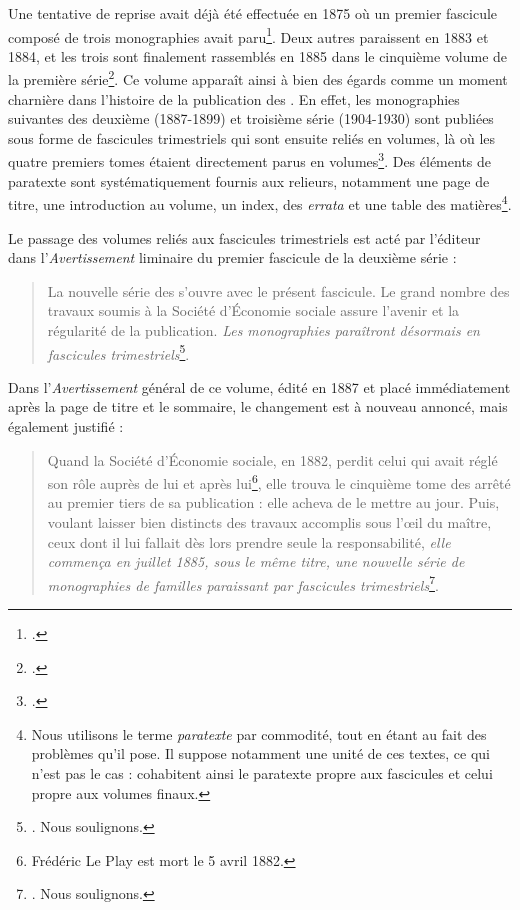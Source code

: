Une tentative de reprise avait déjà été effectuée en 1875 où \og un premier fascicule composé de trois monographies \fg{} avait paru\footcite[p. III]{averts1t5}. Deux autres paraissent en 1883 et 1884, et les trois sont finalement rassemblés en 1885 dans le cinquième volume de la première série\footcite[p. III]{averts1t5}. Ce volume apparaît ainsi à bien des égards comme un moment charnière dans l'histoire de la publication des \odm. En effet, les monographies suivantes des deuxième (1887-1899) et troisième série (1904-1930) sont publiées sous forme de fascicules trimestriels qui sont ensuite reliés en volumes, là où les quatre premiers tomes étaient directement parus en volumes\footnote{\cite[p. 124]{lorry}.}. Des éléments de paratexte sont systématiquement fournis aux relieurs, notamment une page de titre, une introduction au volume, un index, des \textit{errata} et une table des matières\footnote{Nous utilisons le terme \textit{paratexte} par commodité, tout en étant au fait des problèmes qu'il pose. Il suppose notamment une unité de ces textes, ce qui n'est pas le cas : cohabitent ainsi le paratexte propre aux fascicules et celui propre aux volumes finaux.}.

Le passage des volumes reliés aux fascicules trimestriels est acté par l'éditeur dans l'\textit{Avertissement} liminaire du premier fascicule de la deuxième série :

\begin{quote}
    \og La nouvelle série des \odm{} s'ouvre avec 
le présent fascicule. Le grand nombre des travaux soumis à la 
Société d'Économie sociale assure l'avenir et la régularité 
de la publication. \textit{Les monographies paraîtront désormais en 
fascicules trimestriels}\footnote{\cite[\og Avertissement \fg{}]{mono047a}. Nous soulignons.}. \fg{}
\end{quote}

Dans l'\textit{Avertissement} général de ce volume, édité en 1887 et placé immédiatement après la page de titre et le sommaire, le changement est à nouveau annoncé, mais également justifié :

\begin{quote}
    \og Quand la Société d'Économie sociale, en 1882, perdit celui qui 
avait réglé son rôle auprès de lui et après lui\footnote{Frédéric Le Play est mort le 5 avril 1882.}, elle trouva le cinquième tome des \odm{} arrêté au premier tiers de sa publication : elle acheva de le mettre au jour. Puis, voulant laisser bien distincts des travaux accomplis sous l'\oe{}il du maître, ceux dont il lui fallait dès lors prendre seule la responsabilité, \textit{elle commença en juillet 1885, sous le même titre, une nouvelle série de monographies de familles paraissant par fascicules trimestriels}\footnote{\cite[spec. p. II]{s2avert}. Nous soulignons.}. \fg{}
\end{quote}

